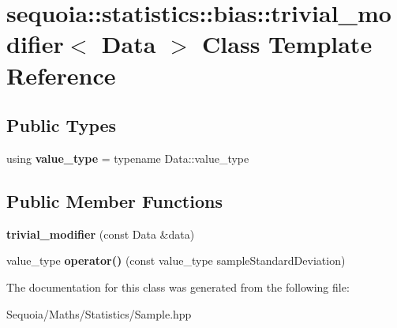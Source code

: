 \hypertarget{classsequoia_1_1statistics_1_1bias_1_1trivial__modifier}{}\section{sequoia\+::statistics\+::bias\+::trivial\+\_\+modifier$<$ Data $>$ Class Template Reference}
\label{classsequoia_1_1statistics_1_1bias_1_1trivial__modifier}
\subsection*{Public Types}
\begin{DoxyCompactItemize}
\item 
\mbox{\label{classsequoia_1_1statistics_1_1bias_1_1trivial__modifier_a508454fbde75dbb2e537244e226ff08a}} 
using {\bfseries value\+\_\+type} = typename Data\+::value\+\_\+type
\end{DoxyCompactItemize}
\subsection*{Public Member Functions}
\begin{DoxyCompactItemize}
\item 
\mbox{\label{classsequoia_1_1statistics_1_1bias_1_1trivial__modifier_a6ca736f8e8b7007bbca0d5d5f159c368}} 
{\bfseries trivial\+\_\+modifier} (const Data \&data)
\item 
\mbox{\label{classsequoia_1_1statistics_1_1bias_1_1trivial__modifier_a64819d6dc5b09222e915fa6bdb7e7d2f}} 
value\+\_\+type {\bfseries operator()} (const value\+\_\+type sample\+Standard\+Deviation)
\end{DoxyCompactItemize}


The documentation for this class was generated from the following file\+:\begin{DoxyCompactItemize}
\item 
Sequoia/\+Maths/\+Statistics/Sample.\+hpp\end{DoxyCompactItemize}

